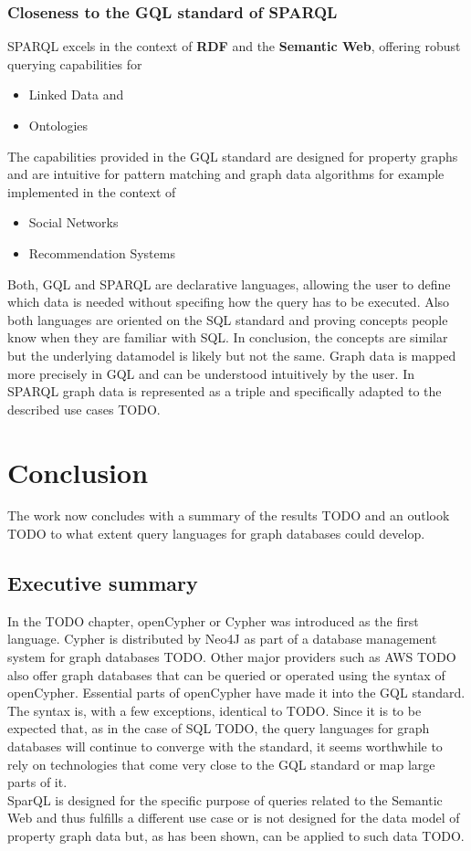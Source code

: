 \subsection{Closeness to the GQL standard of SPARQL}
\label{subsec:different_query_languages_for_graph_databases:sparql:iso}
SPARQL excels in the context of \textbf{RDF} and the \textbf{Semantic Web}, offering robust querying capabilities for 
\begin{itemize}
	\item Linked Data and 
	\item Ontologies
\end{itemize}
The capabilities provided in the GQL standard are designed for property graphs and are 
intuitive for pattern matching and graph data algorithms for example implemented in the context of 
\begin{itemize}
	\item Social Networks
	\item Recommendation Systems
\end{itemize}
Both, GQL and SPARQL are declarative languages, allowing the user to define which data is needed
without specifing how the query has to be executed. Also both languages are oriented on the SQL standard
and proving concepts people know when they are familiar with SQL.
In conclusion, the concepts are similar but the underlying datamodel is likely but not the same.
Graph data is mapped more precisely in GQL and can be understood intuitively by the user.\newline
In SPARQL graph data is represented as a triple and specifically adapted 
to the described use cases TODO.

\chapter{Conclusion}
\label{ch:conclusion}
The work now concludes with a summary of the results TODO and an outlook TODO 
to what extent query languages for graph databases could develop.

\section{Executive summary}
\label{sec:conclusion:executive_summary}
In the TODO chapter, openCypher or Cypher was introduced as the first language. 
Cypher is distributed by Neo4J as part of a database management system for graph databases TODO. 
Other major providers such as AWS TODO also offer graph databases 
that can be queried or operated using the syntax of openCypher.
Essential parts of openCypher have made it into the GQL standard. The syntax is, 
with a few exceptions, identical to TODO. Since it is to be expected that, 
as in the case of SQL TODO, the query languages for graph databases will continue 
to converge with the standard, it seems worthwhile to rely on technologies 
that come very close to the GQL standard or map large parts of it. \\
SparQL is designed for the specific purpose of queries related to the Semantic Web 
and thus fulfills a different use case or is not designed for the data model of property graph data but, 
as has been shown, can be applied to such data TODO.

